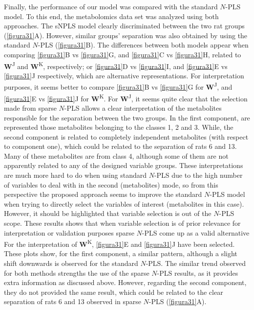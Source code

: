 Finally, the performance of our model was compared with the standard $N$-PLS model. To this end, the metabolomics data set was analyzed using both approaches. The sNPLS model clearly discriminated between the two rat groups (\autoref{figura31}A). However, similar groups’ separation was also obtained by using the standard $N$-PLS (\autoref{figura31}B). The differences between both models appear when comparing \autoref{figura31}B vs \autoref{figura31}G, and \autoref{figura31}C vs \autoref{figura31}H, related to \textbf{W}\textsuperscript{J} and \textbf{W}\textsuperscript{K}, respectively; or \autoref{figura31}D vs \autoref{figura31}I, and \autoref{figura31}E vs \autoref{figura31}J respectively, which are alternative representations. For interpretation purposes, it seems better to compare \autoref{figura31}B vs \autoref{figura31}G for \textbf{W}\textsuperscript{J}, and \autoref{figura31}E vs \autoref{figura31}J for \textbf{W}\textsuperscript{K}. For \textbf{W}\textsuperscript{J}, it seems quite clear that the selection made from sparse $N$-PLS allows a clear interpretation of the metabolites responsible for the separation between the two groups. In the first component, are represented those metabolites belonging to the classes 1, 2 and 3. While, the second component is related to completely independent metabolites (with respect to component one), which could be related to the separation of rats 6 and 13. Many of these metabolites are from class 4, although some of them are not apparently related to any of the designed variable groups.
These interpretations are much more hard to do when using standard $N$-PLS due to the high number of variables to deal with in the second (metabolites) mode, so from this perspective the proposed approach seems to improve the standard $N$-PLS model when trying to directly select the variables of interest (metabolites in this case). However, it should be highlighted that variable selection is out of the $N$-PLS scope. These results shows that when variable selection is of prior relevance for interpretation or validation purposes sparse $N$-PLS come up as a valid alternative
For the interpretation of \textbf{W}\textsuperscript{K}, \autoref{figura31}E and \autoref{figura31}J have been selected. These plots show,  for the first component, a similar pattern, although a slight shift downwards is observed for the standard $N$-PLS. The similar trend observed for both methods strengths the use of the sparse $N$-PLS results, as it provides extra information as discussed above. However, regarding the second component, they do not provided the same result, which could be related to the clear separation of rats 6 and 13 observed in sparse $N$-PLS (\autoref{figura31}A).

